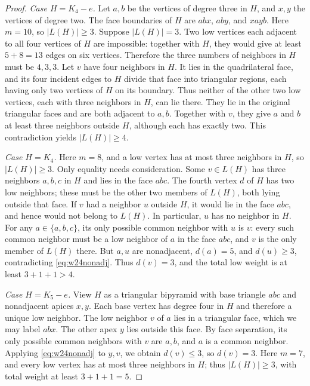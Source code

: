 \documentclass[11pt,a4paper]{article}
\theoremstyle{remark}
\begin{document}
\begin{proof}
\smallskip\noindent
\emph{Case $H=K_4-e$.}
Let $a,b$ be the vertices of degree three in $H$, and $x,y$ the vertices
of degree two. The face boundaries of $H$ are $abx$, $aby$, and $xayb$.
Here $m=10$, so $|L(H)|\geq3$. Suppose $|L(H)|=3$. Two low vertices
each adjacent to all four vertices of $H$ are impossible: together with
$H$, they would give at least $5+8=13$ edges on six vertices. Therefore
the three numbers of neighbors in $H$ must be $4,3,3$.
Let $v$ have four neighbors in $H$. It lies in the quadrilateral face,
and its four incident edges to $H$ divide that face into triangular
regions, each having only two vertices of $H$ on its boundary. Thus
neither of the other two low vertices, each with three neighbors in
$H$, can lie there. They lie in the original triangular faces and are
both adjacent to $a,b$. Together with $v$, they give $a$ and $b$ at
least three neighbors outside $H$, although each has exactly two.
This contradiction yields $|L(H)|\geq4$.

\smallskip\noindent
\emph{Case $H=K_4$.}
Here $m=8$, and a low vertex has at most three neighbors in $H$, so
$|L(H)|\geq3$. Only equality needs consideration. Some $v\in L(H)$
has three neighbors $a,b,c$ in $H$ and lies in the face $abc$.
The fourth vertex $d$ of $H$ has two low neighbors; these must be the
other two members of $L(H)$, both lying outside that face.
If $v$ had a neighbor $u$ outside $H$, it would lie in the face $abc$,
and hence would not belong to $L(H)$. In particular, $u$ has no neighbor
in $H$. For any $a\in\{a,b,c\}$, its only possible common neighbor with
$u$ is $v$: every such common neighbor must be a low neighbor of $a$
in the face $abc$, and $v$ is the only member of $L(H)$ there.
But $a,u$ are nonadjacent, $d(a)=5$, and $d(u)\geq3$, contradicting
\eqref{eq:w24nonadj}. Thus $d(v)=3$, and the total low weight is at
least $3+1+1>4$.

\smallskip\noindent
\emph{Case $H=K_5-e$.}
View $H$ as a triangular bipyramid with base triangle $abc$ and
nonadjacent apices $x,y$. Each base vertex has degree four in $H$ and
therefore a unique low neighbor. The low neighbor $v$ of $a$ lies in a
triangular face, which we may label $abx$. The other apex $y$ lies
outside this face. By face separation, its only possible common
neighbors with $v$ are $a,b$, and $a$ is a common neighbor. Applying
\eqref{eq:w24nonadj} to $y,v$, we obtain $d(v)\leq3$, so $d(v)=3$.
Here $m=7$, and every low vertex has at most three neighbors in $H$;
thus $|L(H)|\geq3$, with total weight at least $3+1+1=5$.


\end{proof}
\end{document}
